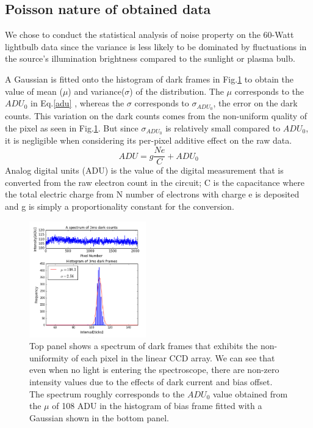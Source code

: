 \documentclass[authoryear, 12pt,5p, times]{elsarticle}
\begin{document}
 \subsection{Poisson nature of obtained data}
 We chose to conduct the statistical analysis of noise property on the 60-Watt lightbulb data since the variance is less likely to be dominated by fluctuations in the source's illumination brightness compared to the sunlight or plasma bulb.  
 
 A Gaussian is fitted onto the histogram of dark frames in Fig.\ref{dark&histo} to obtain the value of mean ($\mu$) and variance($\sigma$) of the distribution. The $\mu$ corresponds to the $ADU_0$ in Eq.\ref{adu} , whereas the $\sigma$ corresponds to $\sigma_{ADU_0}$, the error on the dark counts. This variation on the dark counts comes from the non-uniform quality of the pixel as seen in Fig.\ref{dark&histo}. But since $\sigma_{ADU_0}$ is relatively small compared to $ADU_0$, it is negligible when considering its per-pixel additive effect on the raw data.
 \begin{equation}\label{adu}
 ADU = g \frac{Ne}{C}+ADU_0
 \end{equation}
Analog digital units (ADU) is the value of the digital measurement that is converted from the raw electron count in the circuit; C is the capacitance where the total electric charge from N number of electrons with charge e is deposited and g is simply a proportionality constant for the conversion.
 \begin{figure}[h!]\includegraphics[width=0.45\textwidth]{figures/dark&biashisto}\caption{Top panel shows a spectrum of dark frames that exhibits the non-uniformity of each pixel in the linear CCD array. We can see that even when no light is entering the spectroscope, there are non-zero intensity values due to the effects of dark current and bias offset. The spectrum roughly corresponds to the $ADU_0$ value obtained from the $\mu$ of 108 ADU in the histogram of bias frame fitted with a Gaussian shown in the bottom panel.}\label{dark&histo}\end{figure}
\end{document}
